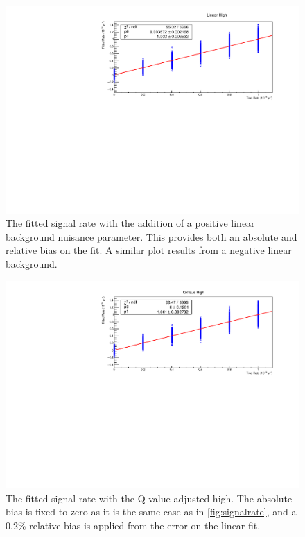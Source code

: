 \begin{figure}
\centering
\includegraphics[width=0.7\linewidth]{Figures/Appendix_Figures/LinearHigh.pdf}
\caption[The fitted signal rate with the addition of a positive linear background nuisance parameter]
{The fitted signal rate with the addition of a positive linear background nuisance parameter.
This provides both an absolute and relative bias on the fit.
A similar plot results from a negative linear background.}
\label{fig:linearhigh}
\end{figure}

\begin{figure}
\centering
\includegraphics[width=0.7\linewidth]{Figures/Appendix_Figures/QValueHigh.pdf}
\caption[The fitted signal rate with the Q-value adjusted high]
{The fitted signal rate with the Q-value adjusted high.
The absolute bias is fixed to zero as it is the same case as in \autoref{fig:signalrate}, and a 0.2\% relative bias is applied from the error on the linear fit.}
\label{fig:qvaluehigh}
\end{figure}

